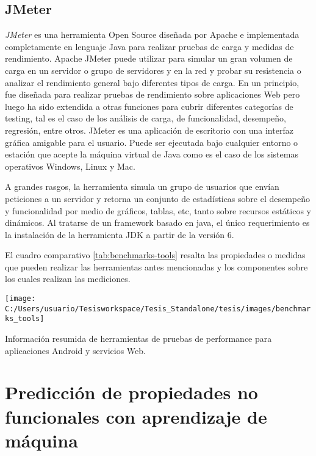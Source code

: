 \subsection{JMeter\label{sub:JMeter}}

\emph{JMeter} es una herramienta Open Source diseñada por Apache e
implementada completamente en lenguaje Java para realizar pruebas
de carga y medidas de rendimiento. Apache JMeter puede utilizar para
simular un gran volumen de carga en un servidor o grupo de servidores
y en la red y probar su resistencia o analizar el rendimiento general
bajo diferentes tipos de carga. En un principio, fue diseñada para
realizar pruebas de rendimiento sobre aplicaciones Web pero luego
ha sido extendida a otras funciones para cubrir diferentes categorías
de testing, tal es el caso de los análisis de carga, de funcionalidad,
desempeño, regresión, entre otros. JMeter es una aplicación de escritorio
con una interfaz gráfica amigable para el usuario. Puede ser ejecutada
bajo cualquier entorno o estación que acepte la máquina virtual de
Java como es el caso de los sistemas operativos Windows, Linux y Mac.

A grandes rasgos, la herramienta simula un grupo de usuarios que envían
peticiones a un servidor y retorna un conjunto de estadísticas sobre
el desempeño y funcionalidad por medio de gráficos, tablas, etc, tanto
sobre recursos estáticos y dinámicos. Al tratarse de un framework
basado en java, el único requerimiento es la instalación de la herramienta
\ac{JDK} a partir de la versión 6. 

El cuadro comparativo \ref{tab:benchmarks-tools} resalta las propiedades
o medidas que pueden realizar las herramientas antes mencionadas y
los componentes sobre los cuales realizan las mediciones.

\begin{table}
\begin{centering}
\texttt{[image: C:/Users/usuario/Tesisworkspace/Tesis\_Standalone/tesis/images/benchmarks\_tools]}
\par\end{centering}

\caption{Información resumida de herramientas de pruebas de performance para
aplicaciones Android y servicios Web.}
\label{tab:benchmarks-tools}
\end{table}



\section{Predicción de propiedades no funcionales con aprendizaje de máquina
\label{sec:Predicci=0000F3n-de-propiedades-no-funcionales-con-aprendizaje-de-m=0000E1quina}}

